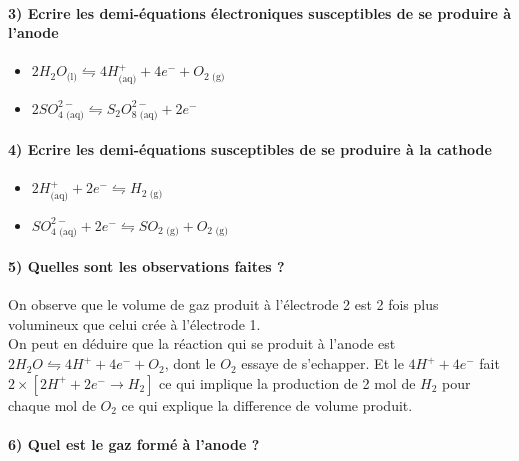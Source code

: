 \documentclass[a4paper, 12pt]{scrartcl}
\begin{document}
\paragraph*{3) Ecrire les demi-équations électroniques susceptibles de se produire à l'anode \\[5mm]}

\begin{itemize}
    \item[\textbullet] $2H_2O_{\text{(l)}} \leftrightharpoons 4H^+_{\text{(aq)}} + 4e^- + O_{2\text{ (g)}}$ \\[2mm]
    \item[\textbullet] $2SO_{4\text{ (aq)}}^{2-} \leftrightharpoons S_2O^{2-}_{8\text{ (aq)}}+2e^-$ \\[2mm]
\end{itemize}

\paragraph*{4) Ecrire les demi-équations susceptibles de se produire à la cathode \\[5mm]}

\begin{itemize}
    \item[\textbullet] $2H^+_{\text{(aq)}} + 2e^- \leftrightharpoons H_{2\text{ (g)}}$ \\[2mm]
    \item[\textbullet] $SO^{2-}_{4\text{ (aq)}} + 2e^-\leftrightharpoons SO_{2\text{ (g)}} + O_{2\text{ (g)}}$ \\[2mm]
\end{itemize}

\paragraph*{5) Quelles sont les observations faites ? \\[5mm]}

On observe que le volume de gaz produit à l'électrode 2 est 2 fois plus volumineux que celui crée à l'électrode 1. \\
On peut en déduire que la réaction qui se produit à l'anode est $2H_2O \leftrightharpoons 4H^+ + 4e^- + O_2$, dont le $O_2$ essaye de s'echapper. 
Et le $4H^+ + 4e^-$ fait $2\times \left[ 2H^+ +2e^- \longrightarrow H_2 \right]$ ce qui implique la production de 2 mol de $H_2$ pour chaque mol de $O_2$ 
ce qui explique la difference de volume produit. 

\paragraph*{6) Quel est le gaz formé à l'anode ? \\[5mm]}
\end{document}
